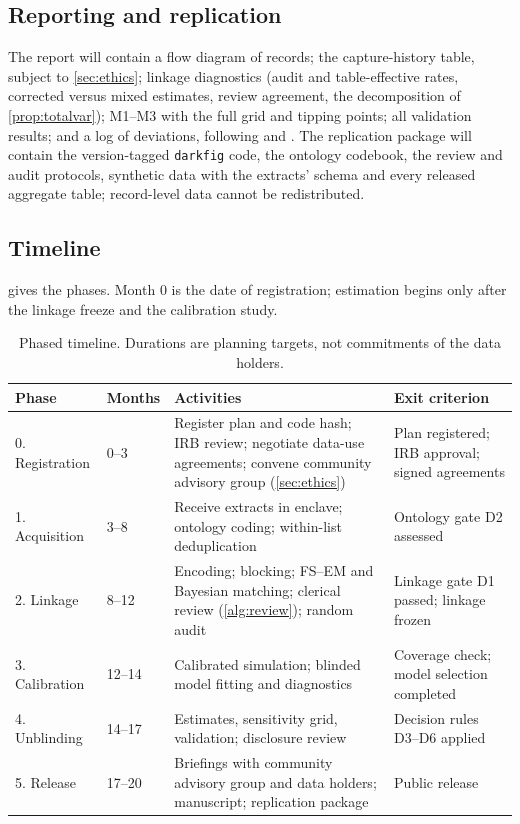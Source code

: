 \subsection{Reporting and replication}\label{sec:plan-reporting}

The report will contain a flow diagram of records; the capture-history table, subject to \cref{sec:ethics}; linkage diagnostics (audit and table-effective rates, corrected versus mixed estimates, review agreement, the decomposition of \cref{prop:totalvar}); M1--M3 with the full grid and tipping points; all validation results; and a log of deviations, following \citet{bird2018} and \citet{lum2013}. The replication package will contain the version-tagged \texttt{darkfig} code, the ontology codebook, the review and audit protocols, synthetic data with the extracts' schema and every released aggregate table; record-level data cannot be redistributed.

\subsection{Timeline}\label{sec:plan-timeline}

 gives the phases. Month 0 is the date of registration; estimation begins only after the linkage freeze and the calibration study.

\begin{table}[tbp]
\centering
\caption{Phased timeline. Durations are planning targets, not commitments of the data holders.}\label{tab:plan-timeline}
\footnotesize
\renewcommand{\arraystretch}{1.15}
\begin{tabularx}{\textwidth}{@{}l l >{\raggedright\arraybackslash}X >{\raggedright\arraybackslash}p{3.6cm}@{}}
\toprule
Phase & Months & Activities & Exit criterion \\
\midrule
0. Registration & 0--3 & Register plan and code hash; IRB review; negotiate data-use agreements; convene community advisory group (\cref{sec:ethics}) & Plan registered; IRB approval; signed agreements \\
1. Acquisition & 3--8 & Receive extracts in enclave; ontology coding; within-list deduplication & Ontology gate D2 assessed \\
2. Linkage & 8--12 & Encoding; blocking; FS--EM and Bayesian matching; clerical review (\cref{alg:review}); random audit & Linkage gate D1 passed; linkage frozen \\
3. Calibration & 12--14 & Calibrated simulation; blinded model fitting and diagnostics & Coverage check; model selection completed \\
4. Unblinding & 14--17 & Estimates, sensitivity grid, validation; disclosure review & Decision rules D3--D6 applied \\
5. Release & 17--20 & Briefings with community advisory group and data holders; manuscript; replication package & Public release \\
\bottomrule
\end{tabularx}
\end{table}
